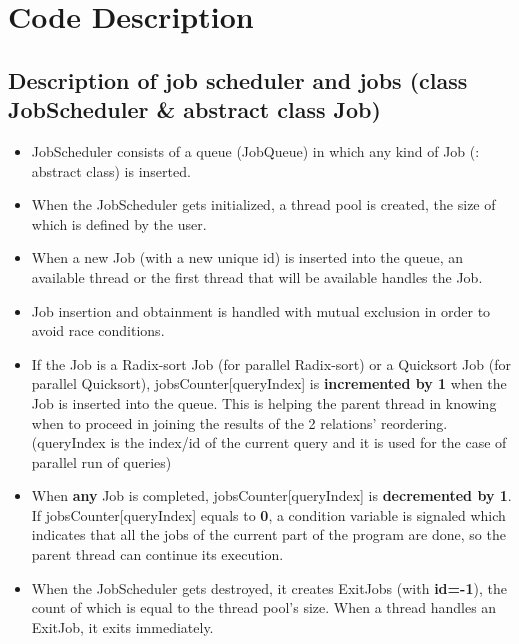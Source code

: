 \documentclass{ws-ijprai}
\begin{document}
\clearpage
\section{Code Description}
\subsection{Description of job scheduler and jobs (class JobScheduler & abstract class Job)}
\begin{itemize}
    \item JobScheduler consists of a queue (JobQueue) in which any kind of Job (: abstract class) is inserted.
    \item When the JobScheduler gets initialized, a thread pool is created, the size of which is defined by the user.
    \item When a new Job (with a new unique id) is inserted into the queue, an available thread or the first thread that will be available handles the Job.
    \item Job insertion and obtainment is handled with mutual exclusion in order to avoid race conditions.
    \item If the Job is a Radix-sort Job (for parallel Radix-sort) or a Quicksort Job (for parallel Quicksort), jobsCounter[queryIndex] is \textbf{incremented by 1} when the Job is inserted into the queue. This is helping the parent thread in knowing when to proceed in joining the results of the 2 relations’ reordering. (queryIndex is the index/id of the current query and it is used for the case of parallel run of queries)
    \item When \textbf{any} Job is completed, jobsCounter[queryIndex] is \textbf{decremented by 1}. If jobsCounter[queryIndex] equals to \textbf{0}, a condition variable is signaled which indicates that all the jobs of the current part of the program are done, so the parent thread can continue its execution.
    \item When the JobScheduler gets destroyed, it creates ExitJobs (with \textbf{id=-1}), the count of which is equal to the thread pool’s size. When a thread handles an ExitJob, it exits immediately.
\end{itemize}
\end{document}
